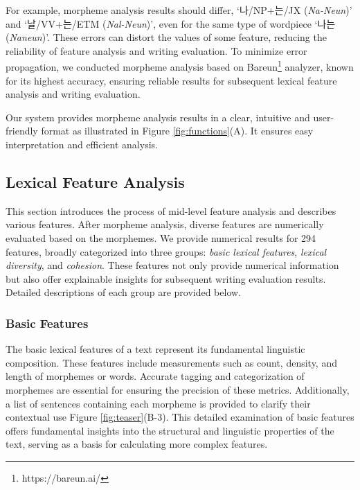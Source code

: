 For example, morpheme analysis results should differ, `나\tiny{/NP}\normalsize{+는}\tiny{/JX}\normalsize{ (\textit{Na-Neun})' and `날}\tiny{/VV}\normalsize{+는}\tiny{/ETM}\normalsize{ (\textit{Nal-Neun})'}, even for the same type of wordpiece `나는 (\textit{Naneun})'. 
These errors can distort the values of some feature, reducing the reliability of feature analysis and writing evaluation. 
To minimize error propagation, we conducted morpheme analysis based on Bareun\footnote{https://bareun.ai/} analyzer, known for its highest accuracy, ensuring reliable results for subsequent lexical feature analysis and writing evaluation.

Our system provides morpheme analysis results in a clear, intuitive and user-friendly format as illustrated in Figure \ref{fig:functions}(A). It ensures easy interpretation and efficient analysis.


\subsection{Lexical Feature Analysis \label{sec:04_model_feature}} 



This section introduces the process of mid-level feature analysis and describes various features.
After morpheme analysis, diverse features are numerically evaluated based on the morphemes. 
We provide numerical results for 294 features, broadly categorized into three groups: \textit{\textsf{basic lexical features}}, \textit{\textsf{lexical diversity}}, and \textit{\textsf{cohesion}}.
These features not only provide numerical information but also offer explainable insights for subsequent writing evaluation results.
Detailed descriptions of each group are provided below.



\subsubsection*{Basic Features} 
The basic lexical features of a text represent its fundamental linguistic composition. 
These features include measurements such as count, density, and length of morphemes or words. 
Accurate tagging and categorization of morphemes are essential for ensuring the precision of these metrics. 
Additionally, a list of sentences containing each morpheme is provided to clarify their contextual use Figure \ref{fig:teaser}(B-3). 
This detailed examination of basic features offers fundamental insights into the structural and linguistic properties of the text, serving as a basis for calculating more complex features.

